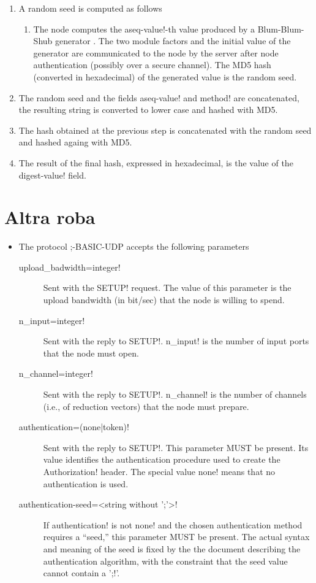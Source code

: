 \begin{enumerate}
\item
A random seed is computed as follows
   \begin{enumerate}
   \item
     The node computes the \ttt aseq-value!-th value produced by a
     Blum-Blum-Shub generator \cite{blum-blum-shub}.  The two module
     factors and the initial value of the generator are communicated
     to the node by the server after node authentication (possibly
     over a secure channel).  The MD5 hash (converted in hexadecimal)
     of the generated value is the random seed.
   \end{enumerate}
\item
The random seed and the fields \ttt aseq-value! and \ttt method! are
concatenated, the resulting string is converted to lower case and
hashed with MD5. 
\item
The hash obtained at the previous step is concatenated with the random
seed and hashed againg with MD5.  
\item
The result of the final hash,
expressed in hexadecimal, is the value of the \ttt digest-value! field.
\end{enumerate}
%

\section{Altra roba}
\label{sect:2.4;transport_layer}

\begin{itemize}
  \item The protocol \ppmtp;-BASIC-UDP accepts the following parameters
    \begin{description}
      \item[\ttt upload\_badwidth=integer!] Sent with the \ttt SETUP!
      request.  The value of this parameter is the upload bandwidth
      (in bit/sec) that the node is willing to spend.
      \item[\ttt n\_input=integer!] Sent with the reply to \ttt SETUP!. \ttt
      n_input! is the number of input ports that the node must open.
      \item[\ttt n\_channel=integer!] Sent with the reply to \ttt SETUP!. \ttt
      n_channel! is the number of channels (i.e., of reduction
      vectors) that the node must prepare.
      \item[\ttt authentication=(none|token)!] Sent with the reply to \ttt
      SETUP!. This parameter MUST be present.  Its value identifies the
      authentication procedure used to create the \ttt Authorization!
      header.  The special value \ttt none! means that no
      authentication is used.
      \item[\ttt authentication-seed=<string without ';'>!]  If \ttt
      authentication! is not \ttt none! and the chosen authentication
      method requires a ``seed,'' this parameter MUST be present.  The
      actual syntax and meaning of the seed is fixed by the the
      document describing the authentication algorithm, with the
      constraint that the seed value cannot contain a '\ttt ;!'.
    \end{description}
\end{itemize}

